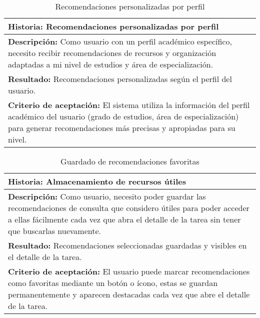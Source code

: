 \documentclass[11pt]{article}
\begin{document}
\begin{table}[H]
    \centering
    \begin{tabular}{|p{15cm}|}
    \hline
    \textbf{Historia: } Recomendaciones personalizadas por perfil\\
    \hline
    \textbf{Descripción: }Como usuario con un perfil académico específico, necesito recibir recomendaciones de 
    recursos y organización adaptadas a mi nivel de estudios y área de especialización.\\
    \hline
    \textbf{Resultado: } Recomendaciones personalizadas según el perfil del usuario.\\
    \hline
    \textbf{Criterio de aceptación: } El sistema utiliza la información del perfil académico del usuario (grado de estudios, 
    área de especialización) para generar recomendaciones más precisas y apropiadas para su nivel.\\
    \hline
    \end{tabular}
    \caption{Recomendaciones personalizadas por perfil}
    \label{user-story8}
\end{table}

\begin{table}[H]
    \centering
    \begin{tabular}{|p{15cm}|}
    \hline
    \textbf{Historia: } Almacenamiento de recursos útiles\\
    \hline
    \textbf{Descripción: }Como usuario, necesito poder guardar las recomendaciones de consulta que considero útiles para poder 
    acceder a ellas fácilmente cada vez que abra el detalle de la tarea sin tener que buscarlas nuevamente.\\
    \hline
    \textbf{Resultado: } Recomendaciones seleccionadas guardadas y visibles en el detalle de la tarea.\\
    \hline
    \textbf{Criterio de aceptación: }El usuario puede marcar recomendaciones como favoritas mediante un botón o ícono, estas se guardan 
    permanentemente y aparecen destacadas cada vez que abre el detalle de la tarea.\\
    \hline
    \end{tabular}
    \caption{Guardado de recomendaciones favoritas}
    \label{user-story9}
\end{table}
\end{document}

